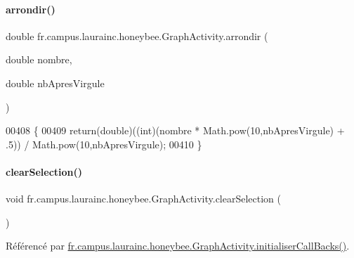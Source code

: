 \mbox{\label{classfr_1_1campus_1_1laurainc_1_1honeybee_1_1_graph_activity_aaf3c4463ff3eba3ea6e5e2ce28b2c060}} 
\paragraph{\texorpdfstring{arrondir()}{arrondir()}}
{\footnotesize\ttfamily double fr.\+campus.\+laurainc.\+honeybee.\+Graph\+Activity.\+arrondir (\begin{DoxyParamCaption}\item[{double}]{nombre,  }\item[{double}]{nb\+Apres\+Virgule }\end{DoxyParamCaption})}


\begin{DoxyCode}
00408     \{
00409         \textcolor{keywordflow}{return}(\textcolor{keywordtype}{double})((int)(nombre * Math.pow(10,nbApresVirgule) + .5)) / Math.pow(10,nbApresVirgule);
00410     \}
\end{DoxyCode}
\mbox{\label{classfr_1_1campus_1_1laurainc_1_1honeybee_1_1_graph_activity_a08cfe45ba23b2f1c40e9812bfe1a1f01}} 
\paragraph{\texorpdfstring{clear\+Selection()}{clearSelection()}}
{\footnotesize\ttfamily void fr.\+campus.\+laurainc.\+honeybee.\+Graph\+Activity.\+clear\+Selection (\begin{DoxyParamCaption}{ }\end{DoxyParamCaption})\hspace{0.3cm}{\ttfamily [private]}}



Référencé par \hyperlink{classfr_1_1campus_1_1laurainc_1_1honeybee_1_1_graph_activity_a8dc56c3e0744bcb9295ad10e726b5fdb}{fr.\+campus.\+laurainc.\+honeybee.\+Graph\+Activity.\+initialiser\+Call\+Backs()}.


